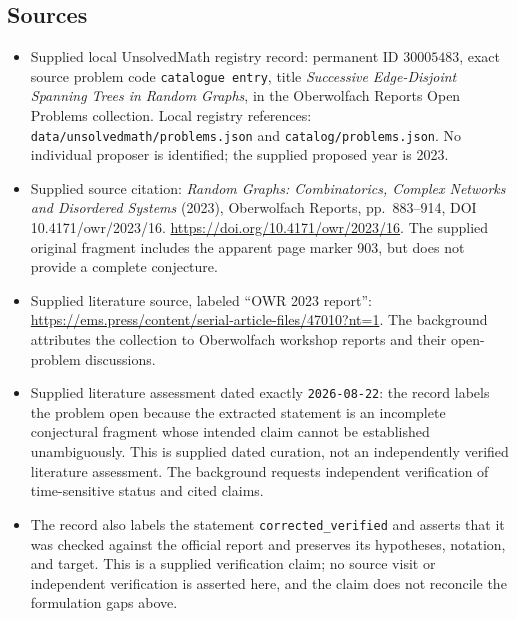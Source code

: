 \documentclass[11pt]{article}
\begin{document}
\subsection{Sources}
\begin{itemize}
\item Supplied local UnsolvedMath registry record: permanent ID \(30005483\), exact source problem code \texttt{catalogue entry}, title \emph{Successive Edge-Disjoint Spanning Trees in Random Graphs}, in the Oberwolfach Reports Open Problems collection. Local registry references: \texttt{data/unsolvedmath/problems.json} and \texttt{catalog/problems.json}. No individual proposer is identified; the supplied proposed year is 2023.
\item Supplied source citation: \emph{Random Graphs: Combinatorics, Complex Networks and Disordered Systems} (2023), Oberwolfach Reports, pp.\ 883--914, DOI 10.4171/owr/2023/16. \url{https://doi.org/10.4171/owr/2023/16}. The supplied original fragment includes the apparent page marker 903, but does not provide a complete conjecture.
\item Supplied literature source, labeled ``OWR 2023 report'': \url{https://ems.press/content/serial-article-files/47010?nt=1}. The background attributes the collection to Oberwolfach workshop reports and their open-problem discussions.
\item Supplied literature assessment dated exactly \texttt{2026-08-22}: the record labels the problem open because the extracted statement is an incomplete conjectural fragment whose intended claim cannot be established unambiguously. This is supplied dated curation, not an independently verified literature assessment. The background requests independent verification of time-sensitive status and cited claims.
\item The record also labels the statement \texttt{corrected\_verified} and asserts that it was checked against the official report and preserves its hypotheses, notation, and target. This is a supplied verification claim; no source visit or independent verification is asserted here, and the claim does not reconcile the formulation gaps above.
\end{itemize}
\end{document}
